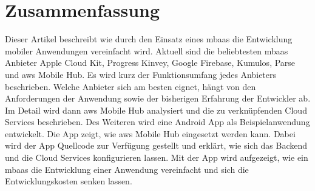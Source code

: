 \section{Zusammenfassung}
Dieser Artikel beschreibt wie durch den Einsatz eines \gls{mbaas} die Entwicklung mobiler Anwendungen vereinfacht wird. Aktuell sind die beliebtesten \gls{mbaas} Anbieter Apple Cloud Kit, Progress Kinvey, Google Firebase, Kumulos, Parse  und \gls{aws} Mobile Hub. Es wird kurz der Funktionsumfang jedes Anbieters beschrieben. Welche Anbieter sich am besten eignet, hängt von den Anforderungen der Anwendung sowie der bisherigen Erfahrung der Entwickler ab. Im Detail wird dann \gls{aws} Mobile Hub analysiert und die zu verknüpfenden Cloud Services beschrieben. Des Weiteren wird eine Android App als Beispielanwendung entwickelt. Die App zeigt, wie \gls{aws} Mobile Hub eingesetzt werden kann. Dabei wird der App Quellcode zur Verfügung gestellt und erklärt, wie sich das Backend und die Cloud Services konfigurieren lassen. Mit der App wird aufgezeigt, wie ein \gls{mbaas} die Entwicklung einer Anwendung vereinfacht und sich die Entwicklungskosten senken lassen.  